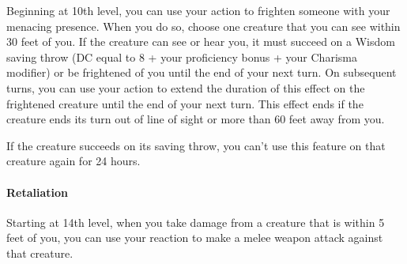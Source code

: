 Beginning at 10th level, you can use your action to frighten someone
with your menacing presence. When you do so, choose one creature that
you can see within 30 feet of you. If the creature can see or hear you,
it must succeed on a Wisdom saving throw (DC equal to 8 + your
proficiency bonus + your Charisma modifier) or be frightened of you
until the end of your next turn. On subsequent turns, you can use your
action to extend the duration of this effect on the frightened creature
until the end of your next turn. This effect ends if the creature ends
its turn out of line of sight or more than 60 feet away from you.

If the creature succeeds on its saving throw, you can't use this feature
on that creature again for 24 hours.

\hypertarget{retaliation}{%
\paragraph{Retaliation}\label{retaliation}}

Starting at 14th level, when you take damage from a creature that is
within 5 feet of you, you can use your reaction to make a melee weapon
attack against that creature.
